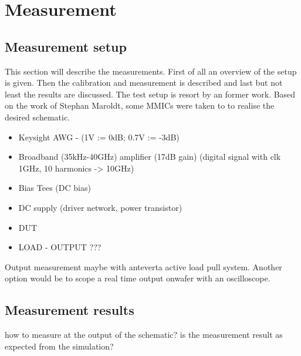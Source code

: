 \chapter{Measurement}
\section{Measurement setup}
This section will describe the measurements. First of all an overview of the setup is given. Then the calibration and measurement is described and last but not least the results are discussed. The test setup is resort by an former work. Based on the work of Stephan Maroldt, some MMICs were taken to to realise the desired schematic. 
\begin{itemize}
	\item Keysight AWG - (1V := 0dB; 0.7V := -3dB)
	\item Broadband (35kHz-40GHz) amplifier (17dB gain) (digital signal with clk 1GHz, 10 harmonics -> 10GHz)
	\item Bias Tees (DC bias)
	\item DC supply (driver network, power transistor)
	\item DUT
	\item LOAD - OUTPUT ???
\end{itemize}
Output measurement maybe with anteverta active load pull system. Another option would be to scope a real time output onwafer with an oscilloscope.
\section{Measurement results}
how to measure at the output of the schematic? is the measurement result as expected from the simulation?